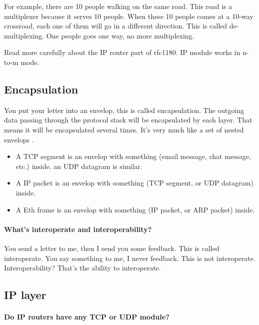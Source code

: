 \documentclass{article}
\begin{document}
For example, there are 10 people walking on the same road. This road is a
multiplexer because it serves 10 people. When these 10 people comes at a 10-way crossroad,
each one of them will go in a different direction. This is called de-multiplexing. One people
goes one way, no more multiplexing.

Read more carefully about the IP router part of rfc1180. IP module works in n-to-m mode.

\subsection{Encapsulation}
\label{sec:encapsulation}

You put your letter into an envelop, this is called encapsulation. The outgoing data
passing through the protocol stack will be encapsulated by each layer. That means it will
be encapsulated several times. It's very much like a set of nested
envelops .

\begin{itemize}
\item A TCP segment is an envelop with something (email message, chat message,
  etc.) inside. an UDP datagram is similar.
\item A IP packet is an envelop with something (TCP segment, or UDP datagram)
  inside.
\item A Eth frame is an envelop with something (IP packet, or ARP packet) inside.
\end{itemize}

\paragraph{What's interoperate and interoperability?}

You send a letter to me, then I send you some feedback. This is called interoperate.
You say something to me, I never feedback. This is not interoperate.
Interoperability? That's the ability to interoperate.

\subsection{IP layer}
\label{sec:ip-layer}

\paragraph{Do IP routers have any TCP or UDP module?}
\end{document}

